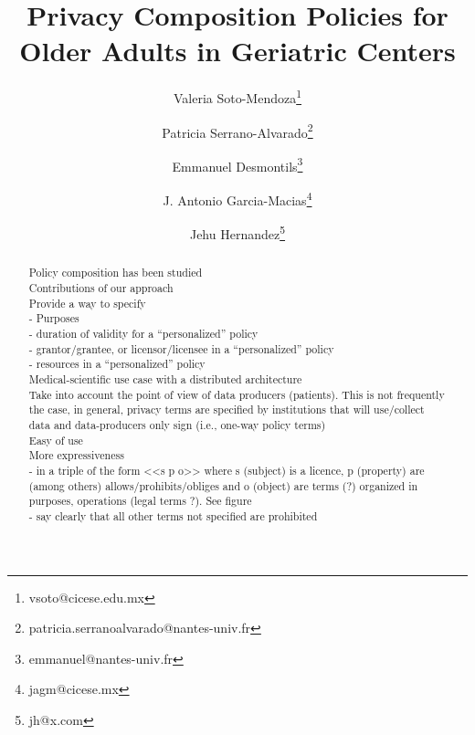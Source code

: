 \documentclass[10pt,letterpaper,oneside,draft]{article}
\begin{document}

\title{Privacy Composition Policies for Older Adults in Geriatric Centers}


\author[1]{Valeria Soto-Mendoza\thanks{vsoto@cicese.edu.mx}}
\author[2]{Patricia Serrano-Alvarado\thanks{patricia.serranoalvarado@nantes-univ.fr}}
\author[2]{Emmanuel Desmontils\thanks{emmanuel@nantes-univ.fr}}
\author[1]{J. Antonio Garcia-Macias\thanks{jagm@cicese.mx}}
\author[3]{Jehu Hernandez\thanks{jh@x.com}}




\maketitle

\begin{abstract}
Policy composition has been studied 
\\
Contributions of our approach
\\
Provide a way to specify 
\\
- Purposes
\\
- duration of validity for a ``personalized'' policy
\\
- grantor/grantee, or licensor/licensee in a ``personalized'' policy
\\
- resources in a ``personalized'' policy
\\
Medical-scientific use case with a distributed architecture
\\
Take into account the point of view of data producers (patients). This is not frequently the case, in general, privacy terms are specified by institutions that will use/collect data and data-producers only sign (i.e., one-way policy terms) 
\\
Easy of use 
\\
More expressiveness
\\
- in a triple of the form <<s p o>> where s (subject) is a licence, p (property) are (among others) allows/prohibits/obliges and o (object) are terms (?) organized in purposes, operations (legal terms ?). See figure 
\\
- say clearly that all other terms not specified are prohibited

\end{abstract}
\end{document}
